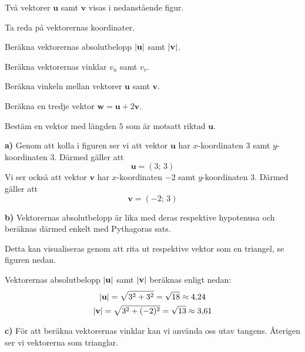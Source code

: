 \begin{exempel}
Två vektorer $\mathbf{u}$ samt $\mathbf{v}$ visas i nedanstående figur.


\begin{parts}
  \item Ta reda på vektorernas koordinater.
  \item Beräkna vektorernas absolutbelopp $\lvert\mathbf{u}\rvert$ samt $\lvert\mathbf{v}\rvert$.
  \item Beräkna vektorernas vinklar $v_u$ samt $v_v$.
  \item Beräkna vinkeln mellan vektorer $\mathbf{u}$ samt $\mathbf{v}$.
  \item Beräkna en tredje vektor $\mathbf{w} = \mathbf{u} + 2\mathbf{v}$.
  \item Bestäm en vektor med längden $5$ som är motsatt riktad $\mathbf{u}$.
\end{parts}

\textbf{a)} Genom att kolla i figuren ser vi att vektor $\mathbf{u}$ har $x$-koordinaten $3$
samt $y$-koordinaten $3$. Därmed gäller att
\[
  \mathbf{u} = (3;\, 3)
\]
Vi ser också att vektor $\mathbf{v}$ har $x$-koordinaten $-2$ samt $y$-koordinaten $3$. Därmed
gäller att
\[
  \mathbf{v} = (-2;\, 3)
\]

\textbf{b)} Vektorernas absolutbelopp är lika med deras respektive hypotenusa och beräknas
därmed enkelt med Pythagoras sats.

Detta kan visualiseras genom att rita ut respektive vektor som en triangel, se figuren nedan.


Vektorernas absolutbelopp $\lvert\mathbf{u}\rvert$ samt $\lvert\mathbf{v}\rvert$ beräknas enligt nedan:
\begin{gather*}
  \lvert\mathbf{u}\rvert = \sqrt{3^2 + 3^2} = \sqrt{18} \approx 4{,}24 \\
  \lvert\mathbf{v}\rvert = \sqrt{3^2 + (-2)^2} = \sqrt{13} \approx 3{,}61
\end{gather*}

\textbf{c)} För att beräkna vektorernas vinklar kan vi använda oss utav tangens. Återigen ser vi
vektorerna som trianglar.


\end{exempel}
